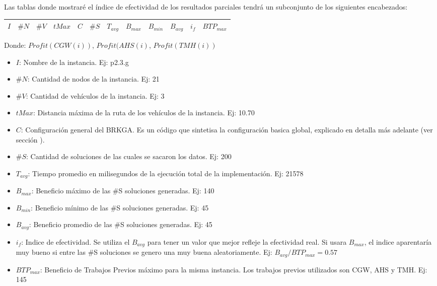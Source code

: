 \bigskip

Las tablas donde mostraré el índice de efectividad de los resultados parciales tendrá un subconjunto de los siguientes encabezados:

\begin{center}
\begin{tabular}{ |c|c|c|c|c|c|c|c|c|c|c|c| } 
 \hline
$I$ & $\#N$ & $\#V$ & $tMax$ & $C$ & $\#S$ & $T_{avg}$ & $B_{max}$ & $B_{min}$ & $B_{avg}$ & $i_{f}$ & $BTP_{max}$ \\
\hline
\end{tabular}
\end{center}

\bigskip

Donde:\label{tableHeader}
$Profit(CGW(i))$, $Profit(AHS(i)$, $Profit(TMH(i))$
\begin{itemize}
	\item \textbf{$I$}: Nombre de la instancia. Ej: p2.3.g
	\item \textbf{$\#N$}: Cantidad de nodos de la instancia. Ej: 21
	\item \textbf{$\#V$}: Cantidad de vehículos de la instancia. Ej: 3
	\item \textbf{$tMax$}: Distancia máxima de la ruta de los vehículos de la instancia. Ej: 10.70
	\item \textbf{$C$}: Configuración general del BRKGA. Es un código que sintetisa la configuración basica global, explicado en detalla más adelante (ver sección \label{sec:descrCongif}).
	\item \textbf{$\#S$}: Cantidad de soluciones de las cuales se sacaron los datos. Ej: 200
	\item \textbf{$T_{avg}$}: Tiempo promedio en milisegundos de la ejecución total de la implementación. Ej: 21578
	\item \textbf{$B_{max}$}: Beneficio máximo de las \#S soluciones generadas. Ej: 140
	\item \textbf{$B_{min}$}: Beneficio mínimo de las \#S soluciones generadas. Ej: 45
	\item \textbf{$B_{avg}$}: Beneficio promedio de las \#S soluciones generadas. Ej: 45
	\item \textbf{$i_{f}$}: Indice de efectividad. Se utiliza el $B_{avg}$ para tener un valor que mejor refleje la efectividad real. Si usara $B_{max}$, el indice aparentaría muy bueno si entre las \#S soluciones se genero una muy buena aleatoriamente. Ej: $B_{avg} / BTP_{max} = 0.57$
	\item \textbf{$BTP_{max}$}: Beneficio de Trabajos Previos máximo para la misma instancia. Los trabajos previos utilizados son CGW, AHS y TMH. Ej: 145
\end{itemize}

